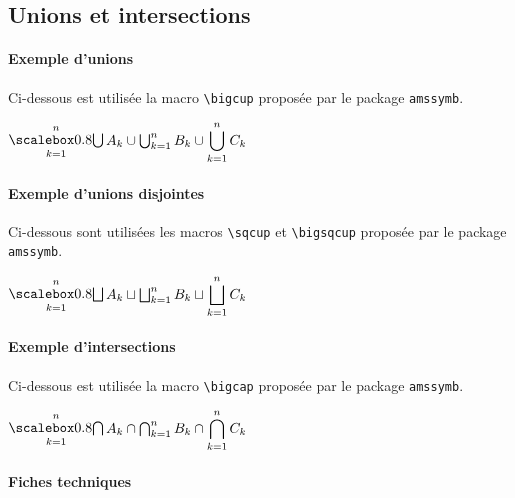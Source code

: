 \documentclass[12pt,a4paper]{article}
\begin{document}

\subsection{Unions et intersections}

\paragraph{Exemple d'unions}

Ci-dessous est utilisée la macro \verb+\bigcup+ proposée par le package \verb+amssymb+.

\begin{tcblisting}{}
$\dcup_{k=1}^{n} A_k \cup \bigcup_{k=1}^{n} B_k \cup 
 \displaystyle \bigcup_{k=1}^{n} C_k$
\end{tcblisting}


\paragraph{Exemple d'unions disjointes}

Ci-dessous sont utilisées les macros \verb+\sqcup+ et \verb+\bigsqcup+ proposée par le package \verb+amssymb+.

\begin{tcblisting}{}
$\dsqcup_{k=1}^{n} A_k \sqcup \bigsqcup_{k=1}^{n} B_k \sqcup
 \displaystyle \bigsqcup_{k=1}^{n} C_k$
\end{tcblisting}


\paragraph{Exemple d'intersections}

Ci-dessous est utilisée la macro \verb+\bigcap+ proposée par le package \verb+amssymb+.

\begin{tcblisting}{}
$\dcap_{k=1}^{n} A_k \cap \bigcap_{k=1}^{n} B_k \cap
 \displaystyle \bigcap_{k=1}^{n} C_k$
\end{tcblisting}


\paragraph{Fiches techniques}



\end{document}
